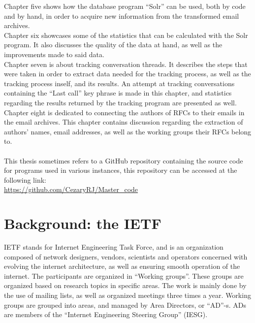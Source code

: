 \documentclass[a4paper,english]{report}
\begin{document}
Chapter five shows how the database program “Solr” can be used, both by code and by hand, in order to acquire new information from the transformed email archives.\\

Chapter six showcases some of the statistics that can be calculated with the Solr program. It also discusses the quality of the data at hand, as well as the improvements made to said data.\\

Chapter seven is about tracking conversation threads. It describes the steps that were taken in order to extract data needed for the tracking process, as well as the tracking process inself, and its results. An attempt at tracking conversations containing the “Last call” key phrase is made in this chapter, and statistics regarding the results returned by the tracking program are presented as well.\\ 

Chapter eight is dedicated to connecting the authors of RFCs to their emails in the email archives. This chapter contains discussion regarding the extraction of authors' names, email addresses, as well as the working groups their RFCs belong to.\\\\

This thesis sometimes refers to a GitHub repository containing the source code for programs used in various instances, this repository can be accessed at the following link:\\

\url{https://github.com/CezaryRJ/Master_code}





\chapter{Background: the IETF}


	IETF stands for Internet Engineering Task Force, and is an organization composed of network designers, vendors, scientists and operators concerned with evolving the internet architecture, as well as ensuring smooth operation of the internet. The participants are organized in  “Working groups”. These groups are organized based on research topics in specific areas. The work is mainly done by the use of mailing lists, as well as organized meetings three times a year. Working groups are grouped into areas, and managed by Area Directors, or “AD”-s.
ADs are members of the “Internet Engineering Steering Group” (IESG).
\end{document}
